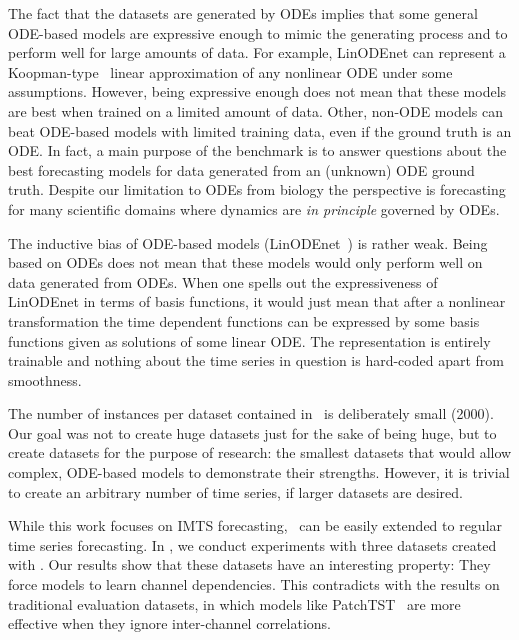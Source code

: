 The fact that the datasets are generated by ODEs implies that some general ODE-based models are expressive enough to mimic the generating process and to perform well for large amounts of data.
For example, LinODEnet can represent a Koopman-type~\citep{Koopman1931.Hamiltonian,Koopman1932.Dynamical} linear approximation of any nonlinear ODE under some assumptions. 
However, being expressive enough does not mean that these models are  best when trained on a limited amount of data.
Other, non-ODE models can beat ODE-based models with limited training data, even if the ground truth is an ODE\@.
In fact, a main purpose of the benchmark is to answer questions about the best forecasting models for data generated from an (unknown) ODE ground truth.  
Despite our limitation to ODEs from biology the perspective is forecasting for many scientific domains where dynamics are \emph{in principle} governed by ODEs.

The inductive bias of ODE-based models (LinODEnet~\citep{Scholz2022.Latenta}) is rather weak.
Being based on ODEs does not mean that these models would only perform well on data generated from ODEs.
When one spells out the expressiveness of LinODEnet in terms of basis functions,
it would just mean that after a nonlinear transformation the time dependent functions can be expressed by some basis functions given as solutions of some linear ODE\@. 
The representation is entirely trainable and nothing about the time series in question is hard-coded apart from smoothness.

The number of instances per dataset contained in \Bench~is deliberately small (2000). Our goal was not to create
huge datasets just for the sake of being huge, but to create
datasets for the purpose of research: the smallest datasets that
would allow complex, ODE-based models to demonstrate their
strengths. However, it is trivial to create an arbitrary number of time series, if larger datasets are desired.  

While this work focuses on IMTS forecasting, \Bench~can be easily extended to regular time series forecasting.
In , we conduct experiments with three datasets created with \Bench. 
Our results show that these datasets have an interesting property: They force models to learn channel dependencies. 
This contradicts with the results on traditional evaluation datasets, in which models like PatchTST~\citep{Nie2023.Time} are more effective when they ignore 
inter-channel correlations.  
